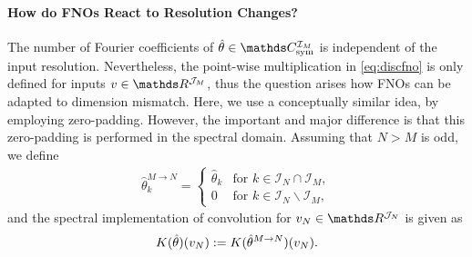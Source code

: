 \paragraph{How do FNOs React to Resolution Changes?}
%
The number of Fourier coefficients of $\hat\param\in\Csym^{\mathcal{I}_M}$ is independent of the input resolution. Nevertheless, the point-wise multiplication in \cref{eq:discfno} is only defined for inputs $\imgg\in\R^{\mathcal{J}_M}$, thus the question arises how FNOs can be adapted to dimension mismatch. Here, we use a conceptually similar idea, by employing zero-padding. However, the important and major difference is that this zero-padding is performed in the spectral domain. Assuming that $N>M$ is odd, we define
%
%
\begin{align*}
\hat{\theta}^{M \rightarrow N}_k = \begin{cases}
\hat{\theta}_k & \text{for } k \in \mathcal{I}_N \cap \mathcal{I}_M,\\
0 & \text{for } k \in \mathcal{I}_N \backslash \mathcal{I}_M,
\end{cases}
\end{align*}
%
%
and the spectral implementation of convolution for $\imgg_N\in\R^{\mathcal{J}_N}$ is given as
%
%
\begin{equation*}
   K(\hat{\theta})(v_N) := K(\hat{\theta}^{M \rightarrow N})(v_N).
\end{equation*}
%
%
